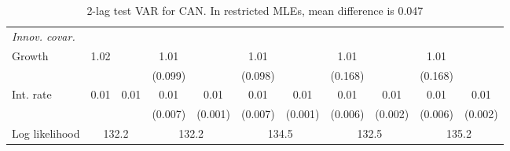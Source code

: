 \begin{table}[htbp]
\begin{tabular}{@{\extracolsep{4pt}}lcccccccccc@{}}
\rule{0pt}{4ex} \emph{Innov. covar.}  	 & 	 & 	 & 	 & 	 & 	 & 	 & 	 & 	 & 	 &\\ 
\quad Growth 	 &1.02 	 &  	 & 1.01 	 &  	 & 1.01 	 &  	 & 1.01 	 &  	 & 1.01 	 & 	 \\ 
 		 &  	 &  	 & (0.099) 	 &  	 & (0.098) 	 &  	 & (0.168) 	 &  	 & (0.168) 	 &  	 \\ 
\quad Int. rate 	 &0.01 	 & 0.01 	 & 0.01 	 & 0.01 	 & 0.01 	 & 0.01 	 & 0.01 	 & 0.01 	 & 0.01 	 & 0.01	 \\ 
 		 &  	 &  	 & (0.007) 	 & (0.001) 	 & (0.007) 	 & (0.001) 	 & (0.006) 	 & (0.002) 	 & (0.006) 	 & (0.002) 	 \\ 
 \hline \rule{0pt}{4ex} 
  Log likelihood 	 &\multicolumn{2}{c}{132.2} 	 & \multicolumn{2}{c}{132.2} 	 & \multicolumn{2}{c}{134.5} 	 & \multicolumn{2}{c}{132.5} 	 & \multicolumn{2}{c}{135.2}\\ 

 \hline 	\end{tabular}		\caption{2-lag test VAR for CAN. In restricted MLEs, mean difference is 0.047}
		\label{tab:CAN2lag}

\end{table}
